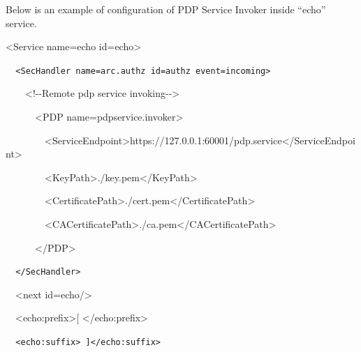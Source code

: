 \documentclass{article}
\begin{document}
{\upshape\color{black}
Below is an example of configuration of PDP Service Invoker inside
{\textquotedblleft}echo{\textquotedblright} service.}

{\ttfamily\color{black}
{\textless}Service name={\textquotedbl}echo{\textquotedbl}
id={\textquotedbl}echo{\textquotedbl}{\textgreater}}

{\upshape\color{black}
\foreignlanguage{spanish}{\texttt{\ \ }}\texttt{{\textless}SecHandler
name={\textquotedbl}arc.authz{\textquotedbl}
id={\textquotedbl}authz{\textquotedbl}
event={\textquotedbl}incoming{\textquotedbl}{\textgreater}}}

{\ttfamily\color{black}
\ \ \ \ {\textless}!-{}-Remote pdp service invoking-{}-{\textgreater}}

{\ttfamily\color{black}
\ \ \ \ \ \ {\textless}PDP
name={\textquotedbl}pdpservice.invoker{\textquotedbl}{\textgreater}}

{\ttfamily\color{black}
\ \ \ \ \ \ \ \ {\textless}ServiceEndpoint{\textgreater}https://127.0.0.1:60001/pdp.service{\textless}/ServiceEndpoint{\textgreater}}

{\ttfamily\color{black}
\ \ \ \ \ \ \ \ {\textless}KeyPath{\textgreater}./key.pem{\textless}/KeyPath{\textgreater}}

{\ttfamily\color{black}
\ \ \ \ \ \ \ \ {\textless}CertificatePath{\textgreater}./cert.pem{\textless}/CertificatePath{\textgreater}}

{\ttfamily\color{black}
\ \ \ \ \ \ \ \ {\textless}CACertificatePath{\textgreater}./ca.pem{\textless}/CACertificatePath{\textgreater}}

{\ttfamily\color{black}
\ \ \ \ \ \ {\textless}/PDP{\textgreater}}

{\upshape\color{black}
\texttt{\ \ }\foreignlanguage{spanish}{\texttt{{\textless}/SecHandler{\textgreater}}}}

{\ttfamily\color{black}
\ \ {\textless}next
id={\textquotedbl}echo{\textquotedbl}/{\textgreater}}

{\ttfamily\color{black}
\ \ {\textless}echo:prefix{\textgreater}[
{\textless}/echo:prefix{\textgreater}}

{\upshape\color{black}
\foreignlanguage{spanish}{\texttt{\ \ }}\texttt{{\textless}echo:suffix{\textgreater}
]{\textless}/echo:suffix{\textgreater}}}
\end{document}
